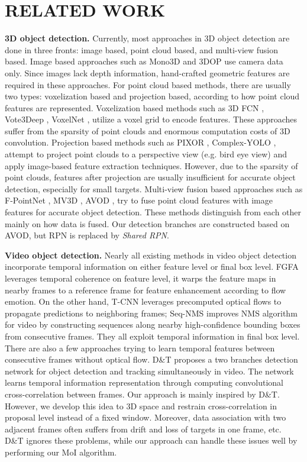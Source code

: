 \documentclass[letterpaper, 10pt, conference]{ieeeconf}  %
\begin{document}
\section{RELATED WORK}

\textbf{3D object detection.} Currently, most approaches in 3D object detection are done in three fronts: image based, point cloud based, and multi-view fusion based. Image based approaches such as Mono3D \cite{7780605} and 3DOP \cite{chen20183d} use camera data only. Since images lack depth information, hand-crafted geometric features are required in these approaches. For point cloud based methods, there are usually two types: voxelization based and projection based, according to how point cloud features are represented. Voxelization based methods such as 3D FCN \cite{li20173d}, Vote3Deep \cite{engelcke2017vote3deep}, VoxelNet \cite{zhou2018voxelnet}, utilize a voxel grid to encode features. These approaches suffer from the sparsity of point clouds and enormous computation costs of 3D convolution. Projection based methods such as PIXOR \cite{yang2018pixor}, Complex-YOLO \cite{simon2018complex, Simon_2019_CVPR_Workshops}, attempt to project point clouds to a perspective view (e.g. bird eye view) and apply image-based feature extraction techniques. However, due to the sparsity of point clouds, features after projection are usually insufficient for accurate object detection, especially for small targets. Multi-view fusion based approaches such as F-PointNet \cite{qi2018frustum}, MV3D \cite{chen2017multi}, AVOD \cite{ku2018joint}, try to fuse point cloud features with image features for accurate object detection. These methods distinguish from each other mainly on how data is fused. Our detection branches are constructed based on AVOD, but RPN is replaced by \textit{Shared RPN}.

\textbf{Video object detection.} Nearly all existing methods in video object detection incorporate temporal information on either feature level or final box level. FGFA \cite{zhu2017flow} leverages temporal coherence on feature level, it warps the feature maps in nearby frames to a reference frame for feature enhancement according to flow emotion. On the other hand, T-CNN \cite{kang2018t, kang2016object} leverages precomputed optical flows to propagate predictions to neighboring frames; Seq-NMS \cite{han2016seq} improves NMS algorithm for video by constructing sequences along nearby high-confidence bounding boxes from consecutive frames. They all exploit temporal information in final box level. There are also a few approaches trying to learn temporal features between consecutive frames without optical flow. D\&T \cite{feichtenhofer2017detect} proposes a two branches detection network for object detection and tracking simultaneously in video. The network learns temporal information representation through computing convolutional cross-correlation between frames. Our approach is mainly inspired by D\&T. However, we develop this idea to 3D space and restrain cross-correlation in proposal level instead of a fixed window. Moreover, data association with two adjacent frames often suffers from drift and loss of targets in one frame, etc. D\&T ignores these problems, while our approach can handle these issues well by performing our MoI algorithm.
\end{document}

